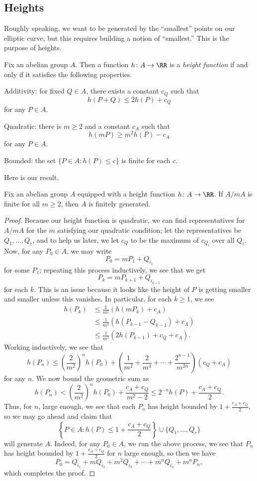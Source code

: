 \documentclass[../notes.tex]{subfiles}
\begin{document}
\subsection{Heights}
Roughly speaking, we want to be generated by the ``smallest'' points on our elliptic curve, but this requires building a notion of ``smallest.'' This is the purpose of heights.
\begin{definition}[height]
	Fix an abelian group $A$. Then a function $h\colon A\to\RR$ is a \textit{height function} if and only if it satisfies the following properties.
	\begin{listalph}
		\item Additivity: for fixed $Q\in A$, there exists a constant $c_Q$ such that
		\[h(P+Q)\le 2h(P)+c_Q\]
		for any $P\in A$.
		\item Quadratic: there is $m\ge2$ and a constant $c_A$ such that
		\[h(mP)\ge m^2h(P)-c_A\]
		for any $P\in A$.
		\item Bounded: the set $\{P\in A:h(P)\le c\}$ is finite for each $c$.
	\end{listalph}
\end{definition}
Here is our result.
\begin{proposition}
	Fix an abelian group $A$ equipped with a height function $h\colon A\to\RR$. If $A/mA$ is finite for all $m\ge2$, then $A$ is finitely generated.
\end{proposition}
\begin{proof}
	Because our height function is quadratic, we can find representatives for $A/mA$ for the $m$ satisfying our quadratic condition; let the representatives be $Q_1,\ldots,Q_r$, and to help us later, we let $c_Q$ to be the maximum of $c_{Q_i}$ over all $Q_i$. Now, for any $P_0\in A$, we may write
	\[P_0=mP_1+Q_{i_1}\]
	for some $P_1$; repeating this process inductively, we see that we get
	\[P_k=mP_{k+1}+Q_{i_{k+1}}\]
	for each $k$. This is an issue because it looks like the height of $P$ is getting smaller and smaller unless this vanishes. In particular, for each $k\ge1$, we see
	\begin{align*}
		h(P_k) &\le \frac1{m^2}\left(h(mP_k)+c_A\right) \\
		&\le \frac1{m^2}\left(h(P_{k-1}-Q_{k-1})+c_A\right) \\
		&\le \frac1{m^2}\left(2h(P_{k-1})+c_Q+c_A\right).
	\end{align*}
	Working inductively, we see that
	\[h(P_n)\le\left(\frac2{m^2}\right)^nh(P_0)+\left(\frac1{m^2}+\frac2{m^4}+\cdots+\frac{2^{n-1}}{m^{2n}}\right)(c_Q+c_A)\]
	for any $n$. We now bound the geometric sum as
	\[h(P_n)<\left(\frac2{m^2}\right)^nh(P_0)+\frac{c_A+c_Q}{m^2-2}\le2^{-n}h(P)+\frac{c_A+c_Q}2.\]
	Thus, for $n$, large enough, we see that each $P_n$ has height bounded by $1+\frac{c_A+c_Q}2$, so we may go ahead and claim that
	\[\left\{P\in A:h(P)\le1+\frac{c_A+c_Q}2\right\}\cup\{Q_1,\ldots,Q_r\}\]
	will generate $A$. Indeed, for any $P_0\in A$, we run the above process, we see that $P_n$ has height bounded by $1+\frac{c_A+c_Q}2$ for $n$ large enough, so then we have
	\[P_0=Q_{i_1}+mQ_{i_2}+m^2Q_{i_3}+\cdots+m^nQ_{i_n}+m^nP_n,\]
	which completes the proof.
\end{proof}
\end{document}
